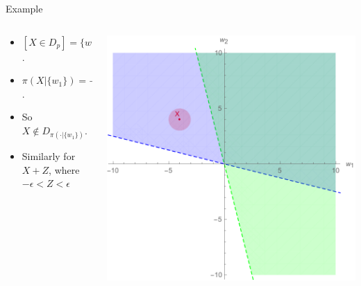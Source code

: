 \documentclass[aspectratio=169, dvipsnames]{beamer}
\begin{document}
\begin{frame}{Example}
  \begin{columns}
    \begin{column}{.38\linewidth}
      \begin{itemize}
      \item $[X \in D_p] = \{w_1\}$.
      \item $\pi(X| \{w_1\}) = -4$.
      \item So $X \notin D_{\pi(\cdot| \{w_1\})}$.
      \item Similarly for $X + Z$, where $-\epsilon < Z < \epsilon$
      \end{itemize}
    \end{column}
    \begin{column}{.6\linewidth}
      \begin{center}
        \includegraphics[width=.92\textwidth]{TTFailure2.pdf}
      \end{center}
    \end{column}
  \end{columns}
\end{frame}
\end{document}
